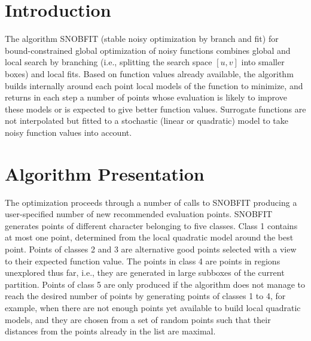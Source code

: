 \documentclass{sig-alternate}
\begin{document}



\section{Introduction}
%

The algorithm SNOBFIT (stable noisy optimization by branch and fit)
\cite{snobfit} for bound-constrained global
optimization of noisy functions
combines global and local search by
branching (i.e., splitting the search space $[u,v]$ into smaller boxes) and local 
fits. Based on function values already available, the algorithm builds internally
around each point local models of the function to minimize, and returns in each step 
a number of points whose evaluation is likely to improve these models or is expected
to give better function values. Surrogate functions are not interpolated but
fitted to a stochastic (linear or quadratic) model to take noisy function values
into account.

\section{Algorithm Presentation}
%

The optimization proceeds through a number of calls to SNOBFIT producing a 
user-specified number of new recommended evaluation points. SNOBFIT generates
points of different character belonging to five classes. Class 1 contains at
most one point, determined from the local quadratic model around the best point.
Points of classes 2 and 3 are alternative good points selected with a view to
their expected function value. The points in class 4 are points in regions
unexplored thus far, i.e., they are generated in large subboxes of the current
partition. Points of class 5 are only produced if the algorithm does not manage 
to reach the desired number of points by generating points of classes 1 to 4, 
for example, when there are not enough points yet available to build local
quadratic models, and they are chosen from a set of random points such that
their distances from the points already in the list are maximal.
\end{document}
